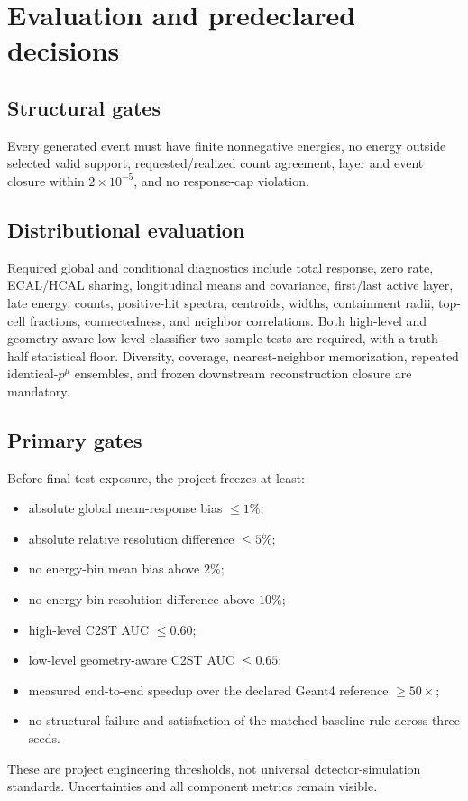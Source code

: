 \documentclass[10pt,a4paper]{article}
\newcommand{\pFour}{p^{\mu}}
\begin{document}
\section{Evaluation and predeclared decisions}

\subsection{Structural gates}
Every generated event must have finite nonnegative energies, no energy outside selected valid support, requested/realized count agreement, layer and event closure within $2\times10^{-5}$, and no response-cap violation.

\subsection{Distributional evaluation}
Required global and conditional diagnostics include total response, zero rate, ECAL/HCAL sharing, longitudinal means and covariance, first/last active layer, late energy, counts, positive-hit spectra, centroids, widths, containment radii, top-cell fractions, connectedness, and neighbor correlations. Both high-level and geometry-aware low-level classifier two-sample tests are required, with a truth-half statistical floor. Diversity, coverage, nearest-neighbor memorization, repeated identical-$\pFour$ ensembles, and frozen downstream reconstruction closure are mandatory.

\subsection{Primary gates}
Before final-test exposure, the project freezes at least:
\begin{itemize}
\item absolute global mean-response bias $\le1\%$;
\item absolute relative resolution difference $\le5\%$;
\item no energy-bin mean bias above $2\%$;
\item no energy-bin resolution difference above $10\%$;
\item high-level C2ST AUC $\le0.60$;
\item low-level geometry-aware C2ST AUC $\le0.65$;
\item measured end-to-end speedup over the declared Geant4 reference $\ge50\times$;
\item no structural failure and satisfaction of the matched baseline rule across three seeds.
\end{itemize}
These are project engineering thresholds, not universal detector-simulation standards. Uncertainties and all component metrics remain visible.
\end{document}
